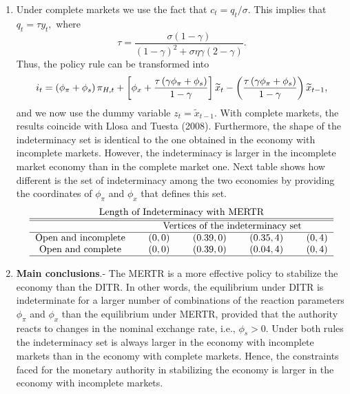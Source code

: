 \documentclass{article}
\begin{document}
\begin{enumerate}
\item Under complete markets we use the fact that $c_{t}=q_{t}/\sigma .$
This implies that $q_{t}=\tau y_{t},$ where 
\begin{equation*}
\tau =\frac{\sigma \left( 1-\gamma \right) }{\left( 1-\gamma \right)
^{2}+\sigma \eta \gamma \left( 2-\gamma \right) }.
\end{equation*}%
Thus, the policy rule can be transformed into%
\begin{equation*}
i_{t}=\left( \phi _{\pi }+\phi _{s}\right) \pi _{H,t}+\left[ \phi _{x}+\frac{%
\tau \left( \gamma \phi _{\pi }+\phi _{s}\right) }{1-\gamma }\right] 
\widetilde{x}_{t}-\left( \frac{\tau \left( \gamma \phi _{\pi }+\phi
_{s}\right) }{1-\gamma }\right) \widetilde{x}_{t-1},
\end{equation*}%
and we now use the dummy variable $z_{t}=\widetilde{x}_{t-1}.$ With complete
markets, the results coincide with Llosa and Tuesta (2008). Furthermore, the
shape of the indeterminacy set is identical to the one obtained in the
economy with incomplete markets. However, the indeterminacy is larger in the
incomplete market economy than in the complete market one. Next table shows
how different is the set of indeterminacy among the two economies by
providing the coordinates of $\phi _{\pi }$ and $\phi _{x}$ that defines
this set.%
\begin{equation*}
\begin{tabular}{lcccccccc}
\multicolumn{9}{c}{Length of Indeterminacy with MERTR} \\ \hline\hline
& \multicolumn{8}{c}{Vertices of the indeterminacy set} \\ \hline
\multicolumn{1}{c}{Open and incomplete} &  & $\left( 0,0\right) $ &  & $%
\left( 0.39,0\right) $ &  & $\left( 0.35,4\right) $ &  & $\left( 0,4\right) $
\\ 
\multicolumn{1}{c}{Open and complete} &  & $\left( 0,0\right) $ &  & $\left(
0.39,0\right) $ &  & $\left( 0.04,4\right) $ &  & $\left( 0,4\right) $ \\ 
\hline
\end{tabular}%
\end{equation*}

\item \textbf{Main conclusions}.- The MERTR is a more effective policy to
stabilize the economy than the DITR. In other words, the equilibrium under
DITR is indeterminate for a larger number of combinations of the reaction
parameters $\phi _{\pi }$ and $\phi _{x}$ than the equilibrium under MERTR,
provided that the authority reacts to changes in the nominal exchange rate,
i.e., $\phi _{s}>0.$ Under both rules the indeterminacy set is always larger
in the economy with incomplete markets than in the economy with complete
markets. Hence, the constraints faced for the monetary authority in
stabilizing the economy is larger in the economy with incomplete markets.
\end{enumerate}
\end{document}
